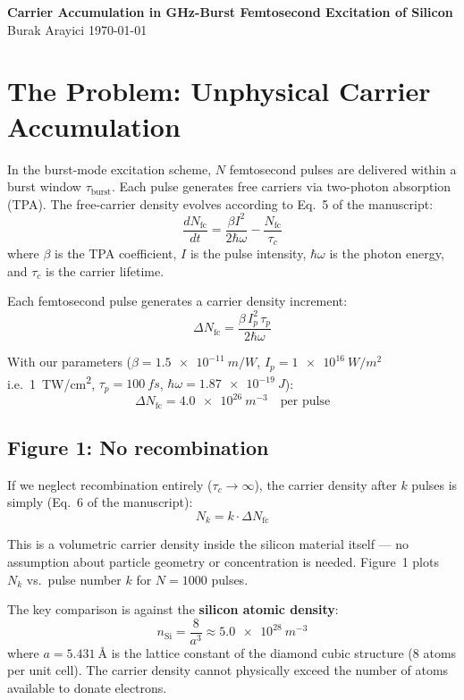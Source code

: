 \documentclass[11pt,a4paper]{article}
\begin{document}
\noindent\textbf{\large Carrier Accumulation in GHz-Burst Femtosecond Excitation of Silicon}\\[4pt]
\noindent Burak Arayici \hfill \today

\bigskip

\section{The Problem: Unphysical Carrier Accumulation}

In the burst-mode excitation scheme, $N$ femtosecond pulses are delivered within a burst window $\tau_\text{burst}$. Each pulse generates free carriers via two-photon absorption (TPA). The free-carrier density evolves according to Eq.~5 of the manuscript:
\begin{equation}
\frac{dN_\text{fc}}{dt} = \frac{\beta I^2}{2\hbar\omega} - \frac{N_\text{fc}}{\tau_c}
\label{eq:rate}
\end{equation}
where $\beta$ is the TPA coefficient, $I$ is the pulse intensity, $\hbar\omega$ is the photon energy, and $\tau_c$ is the carrier lifetime.

Each femtosecond pulse generates a carrier density increment:
\begin{equation}
\Delta N_\text{fc} = \frac{\beta\, I_p^2\, \tau_p}{2\hbar\omega}
\label{eq:deltaN}
\end{equation}

With our parameters ($\beta = \SI{1.5e-11}{m/W}$, $I_p = \SI{1e16}{W/m^2}$ i.e.\ \SI{1}{TW/cm^2}, $\tau_p = \SI{100}{fs}$, $\hbar\omega = \SI{1.87e-19}{J}$):
\[
\Delta N_\text{fc} = \SI{4.0e26}{m^{-3}} \quad \text{per pulse}
\]

\subsection{Figure 1: No recombination}

If we neglect recombination entirely ($\tau_c \to \infty$), the carrier density after $k$ pulses is simply (Eq.~6 of the manuscript):
\begin{equation}
N_k = k \cdot \Delta N_\text{fc}
\label{eq:linear}
\end{equation}

This is a volumetric carrier density inside the silicon material itself --- no assumption about particle geometry or concentration is needed. Figure~1 plots $N_k$ vs.\ pulse number $k$ for $N = 1000$ pulses.

The key comparison is against the \textbf{silicon atomic density}:
\[
n_\text{Si} = \frac{8}{a^3} \approx \SI{5.0e28}{m^{-3}}
\]
where $a = \SI{5.431}{\angstrom}$ is the lattice constant of the diamond cubic structure (8 atoms per unit cell). The carrier density cannot physically exceed the number of atoms available to donate electrons.
\end{document}
